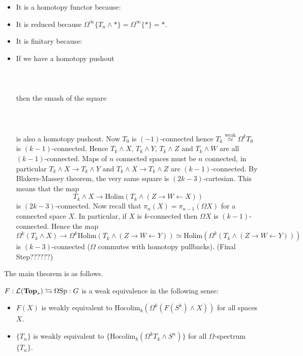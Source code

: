 \documentclass[a4paper]{article}
\begin{document}
\begin{itemize}
\item It is a homotopy functor because: 
\item It is reduced because $\Omega^\infty\{T_n\wedge\ast\}=\Omega^\infty\{\ast\}=\ast$. 
\item It is finitary because: 
\item If we have a homotopy pushout \\~\\
\\~\\
then the smash of the square \\~\\
\\~\\
is also a homotopy pushout. Now $T_0$ is $(-1)$-connected hence $T_k\overset{\text{weak}}{\simeq}\Omega^k T_0$ is $(k-1)$-connected. Hence $T_k\wedge X$, $T_k\wedge Y$, $T_k\wedge Z$ and $T_k\wedge W$ are all $(k-1)$-connected. Maps of $n$ connected spaces must be $n$ connected, in particular $T_k\wedge X\to T_k\wedge Y$ and $T_k\wedge X\to T_k\wedge Z$ are $(k-1)$-connected. By Blakers-Massey theorem, the very same square is $(2k-3)$-cartesian. This means that the map $$T_k\wedge X\to\text{Holim}(T_k\wedge(Z\rightarrow W\leftarrow X))$$ is $(2k-3)$-connected. Now recall that $\pi_n(X)=\pi_{n-1}(\Omega X)$ for a connected space $X$. In particular, if $X$ is $k$-connected then $\Omega X$ is $(k-1)$-connected. Hence the map $$\Omega^k\left(T_k\wedge X\right)\to\Omega^k\text{Holim}(T_k\wedge(Z\rightarrow W\leftarrow Y))\simeq\text{Holim}\left(\Omega^k(T_k\wedge(Z\rightarrow W\leftarrow Y))\right)$$ is $(k-3)$-connected ($\Omega$ commutes with homotopy pullbacks). (Final Step??????)

\end{itemize}

The main theorem is as follows. 
\begin{thm}{}{} $F:\mathcal{L}(\bold{Top}_\ast)\leftrightarrows\Omega\text{Sp}:G$ is a weak equivalence in the following sense: 
\begin{itemize}
\item $F(X)$ is weakly equivalent to $\text{Hocolim}_k(\Omega^k(F(S^k)\wedge X))$ for all spaces $X$. 
\item $\{T_n\}$ is weakly equivalent to $\{\text{Hocolim}_k(\Omega^kT_k\wedge S^n)\}$ for all $\Omega$-spectrum $\{T_n\}$. 
\end{itemize}
\end{thm}
\end{document}
